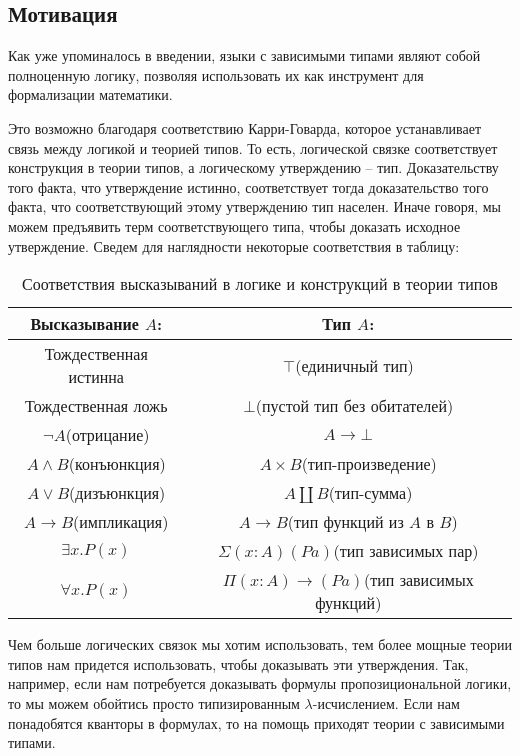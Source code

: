 \subsection{Мотивация}

Как уже упоминалось в введении, языки с зависимыми типами являют собой полноценную логику, позволяя использовать их как инструмент для формализации математики.

Это возможно благодаря соответствию Карри-Говарда, которое устанавливает связь между логикой и теорией типов. То есть, логической связке соответствует конструкция в теории типов, а логическому утверждению -- тип. Доказательству того факта, что утверждение истинно, соответствует тогда доказательство того факта, что соответствующий этому утверждению тип населен. Иначе говоря, мы можем предъявить терм соответствующего типа, чтобы доказать исходное утверждение. Сведем для наглядности некоторые соответствия в таблицу:

\begin{table}[H]
  \centering
  \begin{tabular}{| c | c |}
    \hline
    Высказывание $A$: & Тип $A$: \\
    \hline
    Тождественная истинна & $\top$(единичный тип) \\
    \hline
    Тождественная ложь & $\bot$(пустой тип без обитателей) \\
    \hline
    $\lnot A$(отрицание) & $A \to \bot$ \\
    \hline
    $A \land B$(конъюнкция) & $A \times B$(тип-произведение) \\
    \hline
    $A \lor B$(дизъюнкция) & $A \coprod B$(тип-сумма) \\
    \hline
    $A \to B$(импликация) & $A \to B$(тип функций из $A$ в $B$) \\
    \hline
    $\exists x.P(x)$ & $\Sigma (x : A) (P a)$(тип зависимых пар) \\
    \hline
    $\forall x.P(x)$ & $\Pi (x : A) \to (P a)$(тип зависимых функций) \\
    \hline
  \end{tabular}
  \caption{Соответствия высказываний в логике и конструкций в теории типов}
\end{table}
Чем больше логических связок мы хотим использовать, тем более мощные теории типов  нам придется использовать, чтобы доказывать эти утверждения. Так, например, если нам потребуется доказывать формулы пропозициональной логики, то мы можем обойтись просто типизированным $\lambda$-исчислением. Если нам понадобятся кванторы в формулах, то на помощь приходят теории с зависимыми типами.

